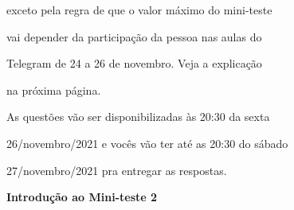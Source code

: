 \documentclass[oneside,12pt]{article}
\begin{document}
\ssk

exceto pela regra de que o valor máximo do mini-teste

vai depender da participação da pessoa nas aulas do

Telegram de 24 a 26 de novembro. Veja a explicação

na próxima página. 

\bsk

As questões vão ser disponibilizadas às 20:30 da sexta

26/novembro/2021 e vocês vão ter até as 20:30 do sábado

27/novembro/2021 pra entregar as respostas.

\newpage


{\bf Introdução ao Mini-teste 2}
\end{document}
